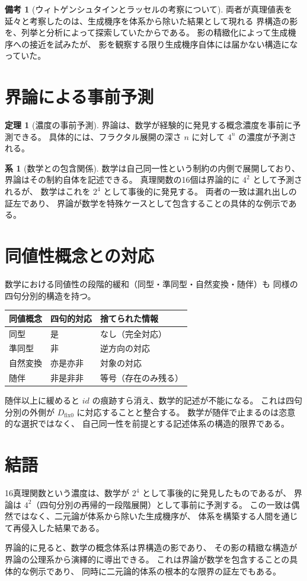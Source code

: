 \documentclass[11pt,a4paper]{article}
\newcommand{\dfix}{D_{\mathrm{fix}0}}
\theoremstyle{definition}
\newtheorem{theorem}{定理}[section]
\newtheorem{corollary}{系}[section]
\newtheorem{remark}{備考}[section]
\begin{document}
\begin{remark}[ウィトゲンシュタインとラッセルの考察について]
両者が真理値表を延々と考察したのは、生成機序を体系から除いた結果として現れる
界構造の影を、列挙と分析によって探索していたからである。
影の精緻化によって生成機序への接近を試みたが、
影を観察する限り生成機序自体には届かない構造になっていた。
\end{remark}

\section{界論による事前予測}

\begin{theorem}[濃度の事前予測]
界論は、数学が経験的に発見する概念濃度を事前に予測できる。
具体的には、フラクタル展開の深さ $n$ に対して $4^n$ の濃度が予測される。
\end{theorem}

\begin{corollary}[数学との包含関係]
数学は自己同一性という制約の内側で展開しており、
界論はその制約自体を記述できる。
真理関数の16個は界論的に $4^2$ として予測されるが、
数学はこれを $2^4$ として事後的に発見する。
両者の一致は漏れ出しの証左であり、
界論が数学を特殊ケースとして包含することの具体的な例示である。
\end{corollary}

\section{同値性概念との対応}

数学における同値性の段階的緩和（同型・準同型・自然変換・随伴）も
同様の四句分別的構造を持つ。

\begin{center}
\begin{tabular}{lll}
\toprule
同値概念 & 四句的対応 & 捨てられた情報 \\
\midrule
同型 & 是 & なし（完全対応） \\
準同型 & 非 & 逆方向の対応 \\
自然変換 & 亦是亦非 & 対象の対応 \\
随伴 & 非是非非 & 等号（存在のみ残る） \\
\bottomrule
\end{tabular}
\end{center}

随伴以上に緩めると $id$ の痕跡すら消え、数学的記述が不能になる。
これは四句分別の外側が $\dfix$ に対応することと整合する。
数学が随伴で止まるのは恣意的な選択ではなく、
自己同一性を前提とする記述体系の構造的限界である。

\section*{結語}

16真理関数という濃度は、数学が $2^4$ として事後的に発見したものであるが、
界論は $4^2$（四句分別の再帰的一段階展開）として事前に予測する。
この一致は偶然ではなく、二元論が体系から除いた生成機序が、
体系を構築する人間を通じて再侵入した結果である。

界論的に見ると、数学の概念体系は界構造の影であり、
その影の精緻な構造が界論の公理系から演繹的に導出できる。
これは界論が数学を包含することの具体的な例示であり、
同時に二元論的体系の根本的な限界の証左でもある。
\end{document}
